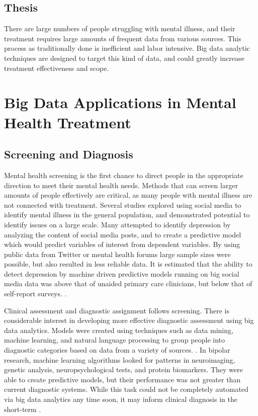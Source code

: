 \documentclass[sigconf]{acmart}
\begin{document}
\subsection{Thesis}

There are large numbers of people struggling with mental illness, and their treatment requires large amounts of frequent data from various sources. This process as traditionally done is inefficient and labor intensive. Big data analytic techniques are designed to target this kind of data, and could greatly increase treatment effectiveness and scope. 

\section{Big Data Applications in Mental Health Treatment}

\subsection{Screening and Diagnosis}
Mental health screening is the first chance to direct people in the appropriate direction to meet their mental health needs. Methods that can screen larger amounts of people effectively are critical, as many people with mental illness are not connected with treatment. Several studies explored using social media to identify mental illness in the general population, and demonstrated potential to identify issues on a large scale. Many attempted to identify depression by analyzing the content of social media posts, and to create a predictive model which would predict variables of interest from dependent variables. By using public data from Twitter or mental health forums large sample sizes were possible, but also resulted in less reliable data. It is estimated that the ability to detect depression by machine driven predictive models running on big social media data was above that of unaided primary care clinicians, but below that of self-report surveys. \cite{detectdepressionsocialmedia}.

Clinical assessment and diagnostic assignment follows screening. There is
considerable interest in developing more effective diagnostic assessment using big data analytics. Models were created using techniques such as data mining, machine learning, and natural language processing to group people into diagnostic categories based on data from a variety of sources. \cite{bigdatabipolar}. In bipolar research, machine learning algorithms looked for patterns in neuroimaging, genetic analysis, neuropsychological tests, and protein biomarkers. They were able to create predictive models, but their performance was not greater than current diagnostic systems. While this task could not be completely automated via big data analytics any time soon, it may inform clinical diagnosis in the short-term \cite{machinelearnbipolar}. 
\end{document}

